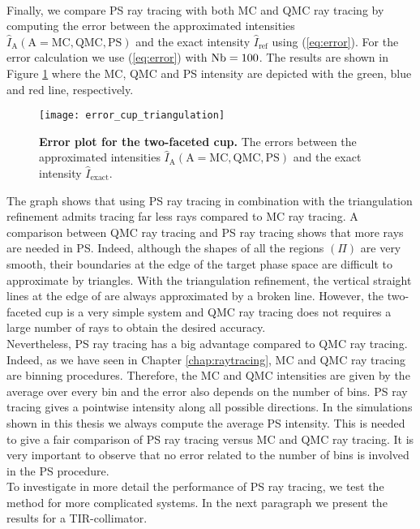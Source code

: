 \\ \indent 
Finally, we compare PS ray tracing with both MC and QMC ray tracing by computing the error between the approximated intensities $\hat{I}_{\textrm{A}}  (\textrm{A}= \textrm{MC}, \textrm{QMC}, \textrm{PS})$ and the exact intensity $\hat{I}_{\textrm{ref}}$ using (\ref{eq:error}). For the error calculation we use (\ref{eq:error}) with $\textrm{Nb} = 100$. The results are shown in Figure \ref{fig:error_cup_triangulation} where the MC, QMC and PS intensity are depicted with the green, blue and red line, respectively.
 \begin{figure}[t]
  \center
  \texttt{[image: error\_cup\_triangulation]}
  \caption{\textbf{Error plot for the two-faceted cup.} The errors between the approximated intensities $\hat{I}_{\textrm{A}} (\textrm{A}= \textrm{MC}, \textrm{QMC}, \textrm{PS})$ and the exact intensity $\hat{I}_{\textrm{exact}}$.}
  \label{fig:error_cup_triangulation}
\end{figure}
The graph shows that using PS ray tracing in combination with the triangulation refinement admits tracing far less rays compared to MC ray tracing.
A comparison between QMC ray tracing and PS ray tracing shows that more rays are needed in PS. Indeed, although the shapes of all the regions $(\Pi)$ are very smooth, their boundaries at the edge of the target phase space  are difficult to approximate by triangles. With the triangulation refinement, the vertical straight lines at the edge of  are always approximated by a broken line. However, the two-faceted cup is a very simple system and QMC ray tracing does not requires a large number of rays to obtain the desired accuracy. \\ \indent Nevertheless, PS ray tracing has a big advantage compared to QMC ray tracing. Indeed, as we have seen in Chapter \ref{chap:raytracing}, MC and QMC ray tracing are binning procedures. Therefore, the MC and QMC intensities are given by the average over every bin and the error also depends on the number of bins. %
PS ray tracing gives a pointwise intensity along all possible directions. In the simulations shown in this thesis we always compute the average PS intensity. This is needed to give a fair comparison of PS ray tracing versus MC and QMC ray tracing. It is very important to observe that no error related to the number of bins is involved in the PS procedure. \\ \indent
To investigate in more detail the performance of PS ray tracing, we test the method for more complicated systems. In the next paragraph we present the results for a TIR-collimator. 
